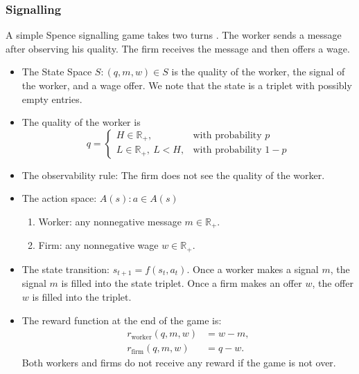 \documentclass[11pt]{article}
\begin{document}
\subsubsection{Signalling}
A simple Spence signalling game takes two turns \cite{spence1973}. The worker sends a message after observing his
quality. The firm receives the message and then offers a wage.
\begin{itemize}
\item The State Space $S:(q,m,w)\in S$ is the quality of the worker, the signal of the worker, and
a wage offer. We note that the state is a triplet with possibly empty entries.
\item The quality of the worker is
\[
q=
\begin{cases}
H\in\mathbb{R}_+, & \text{with probability }p \\
L\in\mathbb{R}_+, \ L<H, & \text{with probability }1-p
\end{cases}
\]
\item The observability rule: The firm does not see the quality of the worker.
\item The action space: $A(s):a\in A(s)$
\begin{enumerate}
  \item Worker: any nonnegative message $m\in\mathbb{R}_+$.
  \item Firm: any nonnegative wage $w\in\mathbb{R}_+$.
\end{enumerate}
\item The state transition: $s_{t+1}=f(s_t,a_t)$.
Once a worker makes a signal $m$, the signal $m$ is filled into the state triplet. Once a firm
makes an offer $w$, the offer $w$ is filled into the triplet.
\item The reward function at the end of the game is:
\begin{align*}
r_{\text{worker}}(q,m,w)&=w-m,\\
r_{\text{firm}}(q,m,w)&=q-w.
\end{align*}
Both workers and firms do not receive any reward if the game is not over.
\end{itemize}
\end{document}
